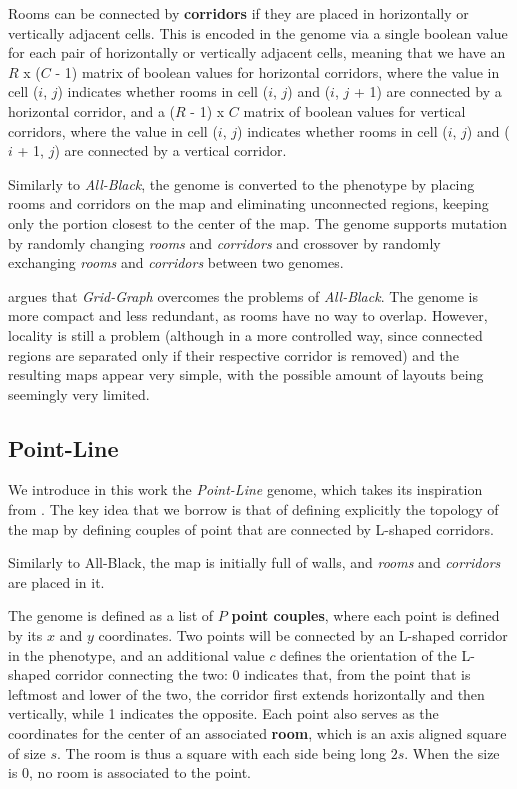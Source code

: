 \documentclass{Configuration_Files/PoliMi3i_thesis}
\begin{document}
Rooms can be connected by \textbf{corridors} if they are placed in horizontally or vertically adjacent cells. This is encoded in the genome via a single boolean value for each pair of horizontally or vertically adjacent cells, meaning that we have an $R$ x ($C$ - 1) matrix of boolean values for horizontal corridors, where the value in cell ($i$, $j$) indicates whether rooms in cell ($i$, $j$) and ($i$, $j$ + 1) are connected by a horizontal corridor, and a ($R$ - 1) x $C$ matrix of boolean values for vertical corridors, where the value in cell ($i$, $j$) indicates whether rooms in cell ($i$, $j$) and ($i$ + 1, $j$) are connected by a vertical corridor.

Similarly to \textit{All-Black}, the genome is converted to the phenotype by placing rooms and corridors on the map and eliminating unconnected regions, keeping only the portion closest to the center of the map. The genome supports mutation by randomly changing \textit{rooms} and \textit{corridors} and crossover by randomly exchanging \textit{rooms} and \textit{corridors} between two genomes.

\citeauthor{bari_evolutionary-based_2023} argues that \textit{Grid-Graph} overcomes the problems of \textit{All-Black}. The genome is more compact and less redundant, as rooms have no way to overlap. However, locality is still a problem (although in a more controlled way, since connected regions are separated only if their respective corridor is removed) and the resulting maps appear very simple, with the possible amount of layouts being seemingly very limited.

\subsection{Point-Line}
\label{subsec:point_line}

We introduce in this work the \textit{Point-Line} genome, which takes its inspiration from \citet{olsted_interactive_2015}. The key idea that we borrow is that of defining explicitly the topology of the map by defining couples of point that are connected by L-shaped corridors.

Similarly to All-Black, the map is initially full of walls, and \textit{rooms} and \textit{corridors} are placed in it. 

The genome is defined as a list of $P$ \textbf{point couples}, where each point is defined by its $x$ and $y$ coordinates. Two points will be connected by an L-shaped corridor in the phenotype, and an additional value $c$ defines the orientation of the L-shaped corridor connecting the two: 0 indicates that, from the point that is leftmost and lower of the two, the corridor first extends horizontally and then vertically, while 1 indicates the opposite. Each point also serves as the coordinates for the center of an associated \textbf{room}, which is an axis aligned square of size $s$. The room is thus a square with each side being long $2s$. When the size is 0, no room is associated to the point.
\end{document}
